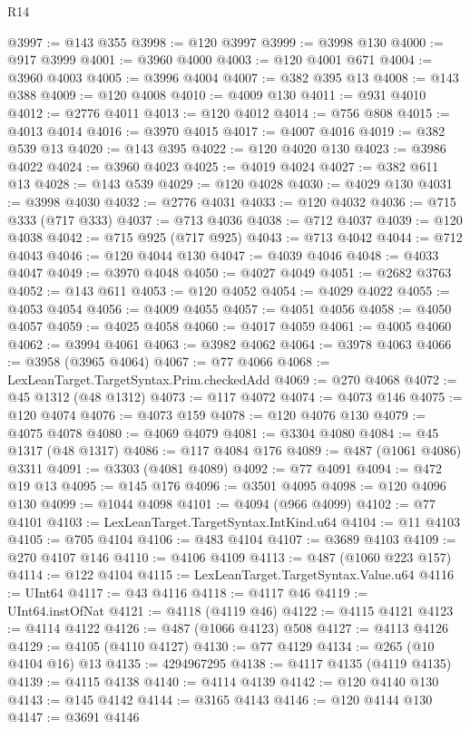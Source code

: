 \begin{lexlean}{R14}
\begin{coremodule}
@3997 := @143 @355
@3998 := @120 @3997
@3999 := @3998 @130
@4000 := @917 @3999
@4001 := @3960 @4000
@4003 := @120 @4001 @671
@4004 := @3960 @4003
@4005 := @3996 @4004
@4007 := @382 @395 @13
@4008 := @143 @388
@4009 := @120 @4008
@4010 := @4009 @130
@4011 := @931 @4010
@4012 := @2776 @4011
@4013 := @120 @4012
@4014 := @756 @808
@4015 := @4013 @4014
@4016 := @3970 @4015
@4017 := @4007 @4016
@4019 := @382 @539 @13
@4020 := @143 @395
@4022 := @120 @4020 @130
@4023 := @3986 @4022
@4024 := @3960 @4023
@4025 := @4019 @4024
@4027 := @382 @611 @13
@4028 := @143 @539
@4029 := @120 @4028
@4030 := @4029 @130
@4031 := @3998 @4030
@4032 := @2776 @4031
@4033 := @120 @4032
@4036 := @715 @333 (@717 @333)
@4037 := @713 @4036
@4038 := @712 @4037
@4039 := @120 @4038
@4042 := @715 @925 (@717 @925)
@4043 := @713 @4042
@4044 := @712 @4043
@4046 := @120 @4044 @130
@4047 := @4039 @4046
@4048 := @4033 @4047
@4049 := @3970 @4048
@4050 := @4027 @4049
@4051 := @2682 @3763
@4052 := @143 @611
@4053 := @120 @4052
@4054 := @4029 @4022
@4055 := @4053 @4054
@4056 := @4009 @4055
@4057 := @4051 @4056
@4058 := @4050 @4057
@4059 := @4025 @4058
@4060 := @4017 @4059
@4061 := @4005 @4060
@4062 := @3994 @4061
@4063 := @3982 @4062
@4064 := @3978 @4063
@4066 := @3958 (@3965 @4064)
@4067 := @77 @4066
@4068 := LexLeanTarget.TargetSyntax.Prim.checkedAdd
@4069 := @270 @4068
@4072 := @45 @1312 (@48 @1312)
@4073 := @117 @4072
@4074 := @4073 @146
@4075 := @120 @4074
@4076 := @4073 @159
@4078 := @120 @4076 @130
@4079 := @4075 @4078
@4080 := @4069 @4079
@4081 := @3304 @4080
@4084 := @45 @1317 (@48 @1317)
@4086 := @117 @4084 @176
@4089 := @487 (@1061 @4086) @3311
@4091 := @3303 (@4081 @4089)
@4092 := @77 @4091
@4094 := @472 @19 @13
@4095 := @145 @176
@4096 := @3501 @4095
@4098 := @120 @4096 @130
@4099 := @1044 @4098
@4101 := @4094 (@966 @4099)
@4102 := @77 @4101
@4103 := LexLeanTarget.TargetSyntax.IntKind.u64
@4104 := @11 @4103
@4105 := @705 @4104
@4106 := @483 @4104
@4107 := @3689 @4103
@4109 := @270 @4107 @146
@4110 := @4106 @4109
@4113 := @487 (@1060 @223 @157)
@4114 := @122 @4104
@4115 := LexLeanTarget.TargetSyntax.Value.u64
@4116 := UInt64
@4117 := @43 @4116
@4118 := @4117 @46
@4119 := UInt64.instOfNat
@4121 := @4118 (@4119 @46)
@4122 := @4115 @4121
@4123 := @4114 @4122
@4126 := @487 (@1066 @4123) @508
@4127 := @4113 @4126
@4129 := @4105 (@4110 @4127)
@4130 := @77 @4129
@4134 := @265 (@10 @4104 @16) @13
@4135 := 4294967295
@4138 := @4117 @4135 (@4119 @4135)
@4139 := @4115 @4138
@4140 := @4114 @4139
@4142 := @120 @4140 @130
@4143 := @145 @4142
@4144 := @3165 @4143
@4146 := @120 @4144 @130
@4147 := @3691 @4146

\end{coremodule}
\end{lexlean}
